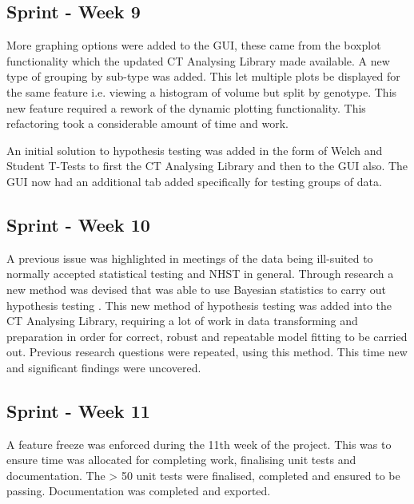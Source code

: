 \documentclass[11pt]{report}
\begin{document}
\subsection{Sprint - Week 9}
\label{sec:orgf0dda1b}
More graphing options were added to the GUI, these came from the boxplot functionality which the updated CT Analysing Library made available. A new type of grouping by sub-type was added. This let multiple plots be displayed for the same feature i.e. viewing a histogram of volume but split by genotype. This new feature required a rework of the dynamic plotting functionality. This refactoring took a considerable amount of time and work.

An initial solution to hypothesis testing was added in the form of Welch and Student T-Tests to first the CT Analysing Library and then to the GUI also. The GUI now had an additional tab added specifically for testing groups of data.

\subsection{Sprint - Week 10}
\label{sec:org02195d6}

A previous issue was highlighted in meetings of the data being ill-suited to normally accepted statistical testing and NHST in general. Through research a new method was devised that was able to use Bayesian statistics to carry out hypothesis testing \cite{Kruschke2012}. This new method of hypothesis testing was added into the CT Analysing Library, requiring a lot of work in data transforming and preparation in order for correct, robust and repeatable model fitting to be carried out.
Previous research questions were repeated, using this method. This time new and significant findings were uncovered.

\subsection{Sprint - Week 11}
\label{sec:orgd4ebf73}
A feature freeze was enforced during the 11th week of the project. This was to ensure time was allocated for completing work, finalising unit tests and documentation. The > 50 unit tests were finalised, completed and ensured to be passing. Documentation was completed and exported.


\clearpage


\end{document}
